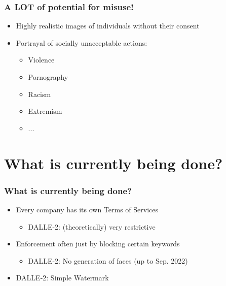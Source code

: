 \documentclass[
	11pt, compress%
]{beamer}
\begin{document}
\begin{frame}
\end{frame}



\begin{frame}
	\frametitle{A LOT of potential for misuse!}
	\begin{itemize}
		\setlength\itemsep{1em}
			\item{Highly realistic images of individuals without their consent}
			\item{Portrayal of socially unacceptable actions:}
			\begin{itemize}
			\setlength\itemsep{0,5em}
			\item{Violence}
			\item{Pornography}
			\item{Racism}
			\item{Extremism}
			\item{...}
			\end{itemize}
	\end{itemize}
\end{frame}

\section{What is currently being done?}

\begin{frame}
	\frametitle{What is currently being done?}
	\begin{itemize}
		\setlength\itemsep{1,3em}
		\item Every company has its own Terms of Services
		\begin{itemize}
			\item DALLE-2: (theoretically) very restrictive
		\end{itemize}
		\item Enforcement often just by blocking certain keywords
		\begin{itemize}
			\item DALLE-2: No generation of faces (up to Sep. 2022)
		\end{itemize}
		\item DALLE-2: Simple Watermark
	\end{itemize}
\end{frame}
\end{document}
